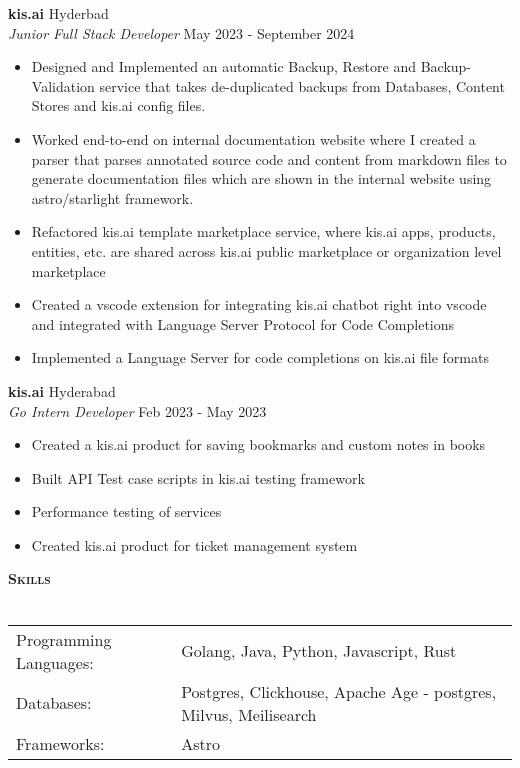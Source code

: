 \documentclass[a4paper]{article}
\newcommand{\lineunder} {
    \vspace*{-8pt} \\
    \hspace*{-18pt} \hrulefill \\
}
\newcommand{\header} [1] {
    {\hspace*{-18pt}\vspace*{6pt} \textbf{\textsc{#1}}}
    \vspace*{-6pt} \lineunder
}
\begin{document}
\textbf{kis.ai} \hfill Hyderbad\\
\textit{Junior Full Stack Developer} \hfill May 2023 - September 2024\\
\vspace{-1mm}
\begin{itemize} \itemsep 1pt
	\item Designed and Implemented an automatic Backup, Restore and Backup-Validation service that takes de-duplicated backups from Databases, Content Stores and kis.ai config files.
	\item Worked end-to-end on internal documentation website where I created a parser that parses annotated source code and content from markdown files to generate documentation files which are shown in the internal website using astro/starlight framework.
	\item Refactored kis.ai template marketplace service, where kis.ai apps, products, entities, etc. are shared across kis.ai public marketplace or organization level marketplace
	\item Created a vscode extension for integrating kis.ai chatbot right into vscode and integrated with Language Server Protocol for Code Completions
	\item Implemented a Language Server for code completions on kis.ai file formats
\end{itemize}
\textbf{kis.ai} \hfill Hyderabad\\
\textit{Go Intern Developer} \hfill Feb 2023 - May 2023\\
\vspace{-1mm}
\begin{itemize} \itemsep 1pt
	\item Created a kis.ai product for saving bookmarks and custom notes in books
	\item Built API Test case scripts in kis.ai testing framework
	\item Performance testing of services
	\item Created kis.ai product for ticket management system
\end{itemize}

\header{Skills}
\begin{tabular}{ l l }
	Programming Languages: & Golang, Java, Python, Javascript, Rust                           \\
	Databases:             & Postgres, Clickhouse, Apache Age - postgres, Milvus, Meilisearch \\
	Frameworks:            & Astro                                                            \\
\end{tabular}
\vspace{2mm}
\end{document}
